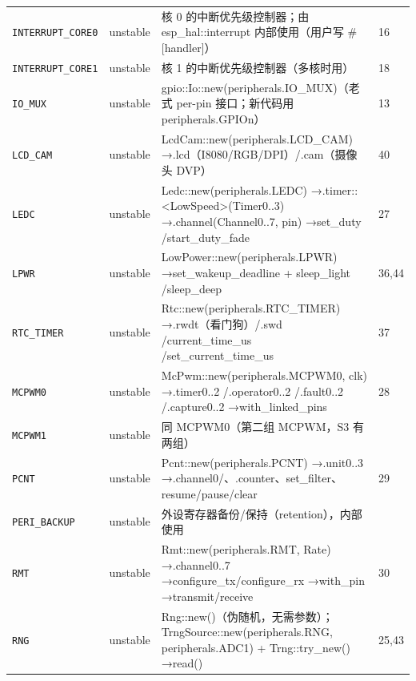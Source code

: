 \documentclass[UTF8,a4paper,11pt,fontset=fandol]{ctexart}
\newcommand{\fld}[1]{\texttt{#1}}
\begin{document}
\begin{center}
\begin{longtable}{@{}p{2.15cm}p{1.0cm}>{\raggedright\arraybackslash}p{9.4cm}p{1.65cm}@{}}
\fld{INTERRUPT\_CORE0} & unstable & 核 0 的中断优先级控制器；由 esp\_hal::\allowbreak interrupt 内部使用（用户写 \#[handler]） & 16 \\
\fld{INTERRUPT\_CORE1} & unstable & 核 1 的中断优先级控制器（多核时用） & 18 \\
\fld{IO\_MUX} & unstable & gpio::\allowbreak Io::\allowbreak new(peripherals.IO\_MUX)（老式 per-pin 接口；新代码用 peripherals.GPIOn） & 13 \\
\fld{LCD\_CAM} & unstable & LcdCam::\allowbreak new(peripherals.LCD\_CAM) →\allowbreak  .lcd（I8080/\allowbreak RGB/\allowbreak DPI）/\allowbreak  .cam（摄像头 DVP） & 40 \\
\fld{LEDC} & unstable & Ledc::\allowbreak new(peripherals.LEDC) →\allowbreak  .timer::\allowbreak <LowSpeed>(Timer0..3) →\allowbreak  .channel(Channel0..7, pin) →\allowbreak  set\_duty /\allowbreak  start\_duty\_fade & 27 \\
\fld{LPWR} & unstable & LowPower::\allowbreak new(peripherals.LPWR) →\allowbreak  set\_wakeup\_deadline + sleep\_light /\allowbreak  sleep\_deep & 36,44 \\
\fld{RTC\_TIMER} & unstable & Rtc::\allowbreak new(peripherals.RTC\_TIMER) →\allowbreak  .rwdt（看门狗）/\allowbreak  .swd /\allowbreak  current\_time\_us /\allowbreak  set\_current\_time\_us & 37 \\
\fld{MCPWM0} & unstable & McPwm::\allowbreak new(peripherals.MCPWM0, clk) →\allowbreak  .timer0..2 /\allowbreak  .operator0..2 /\allowbreak  .fault0..2 /\allowbreak  .capture0..2 →\allowbreak  with\_linked\_pins & 28 \\
\fld{MCPWM1} & unstable & 同 MCPWM0（第二组 MCPWM，S3 有两组） &  \\
\fld{PCNT} & unstable & Pcnt::\allowbreak new(peripherals.PCNT) →\allowbreak  .unit0..3 →\allowbreak  .channel0/\allowbreak 1、.counter、set\_filter、resume/\allowbreak pause/\allowbreak clear & 29 \\
\fld{PERI\_BACKUP} & unstable & 外设寄存器备份/\allowbreak 保持（retention），内部使用 &  \\
\fld{RMT} & unstable & Rmt::\allowbreak new(peripherals.RMT, Rate) →\allowbreak  .channel0..7 →\allowbreak  configure\_tx/\allowbreak configure\_rx →\allowbreak  with\_pin →\allowbreak  transmit/\allowbreak receive & 30 \\
\fld{RNG} & unstable & Rng::\allowbreak new()（伪随机，无需参数）；TrngSource::\allowbreak new(peripherals.RNG, peripherals.ADC1) + Trng::\allowbreak try\_new() →\allowbreak  read() & 25,43 \\

\end{longtable}
\end{center}
\end{document}
